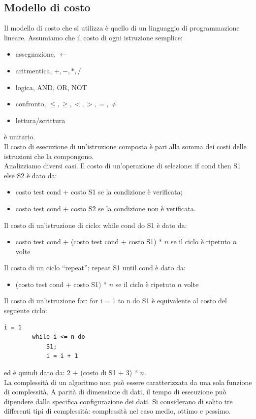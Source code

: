 \documentclass[12pt]{report}
\begin{document}
   	\subsection{Modello di costo}
   	Il modello di costo che si utilizza è quello di un linguaggio di programmazione lineare. Assumiamo che il costo di ogni istruzione semplice:
   	\begin{itemize}
   		\item assegnazione, $\leftarrow $
   		\item aritmentica, $+, -, *, /$
   		\item logica, AND, OR, NOT
   		\item confronto, $\leq, \geq, <, >, =, \neq$
   		\item lettura/scrittura
   	\end{itemize}
   	è unitario. \\
   	Il costo di esecuzione di un'istruzione composta è pari alla somma dei costi delle istruzioni che la compongono. \\
   	Analizziamo diversi casi. Il costo di un'operazione di selezione: if cond then S1 else S2 è dato da:
   	\begin{itemize}
   		\item costo test cond + costo S1 se la condizione è verificata;
   		\item costo test cond + costo S2 se la condizione non è verificata.
   	\end{itemize}
   	Il costo di un'istruzione di ciclo: while cond do S1 è dato da:
   	\begin{itemize}
   		\item costo test cond + (costo test cond + costo S1) * $n$ se il ciclo è ripetuto $n$ volte
   	\end{itemize}
   	Il costo di un ciclo ``repeat'': repeat S1 until cond è dato da:
   	\begin{itemize}
   		\item (costo test cond + costo S1) * $n$ se il ciclo è ripetuto $n$ volte
   	\end{itemize}
   	Il costo di un'istruzione for: for i = 1 to n do S1 è equivalente al costo del seguente ciclo:
   	\begin{lstlisting}[style=pascalstyle]
   		i = 1
   		while i <= n do
   			S1;
   			i = i + 1
   	\end{lstlisting}
   	ed è quindi dato da: 2 + (costo di S1 + 3) * $n$. \\
   	La complessità di un algoritmo non può essere caratterizzata da una sola funzione di complessità. A parità di dimensione di dati, il tempo di esecuzione può dipendere dalla specifica configurazione dei dati. Si considerano di solito tre differenti tipi di complessità: complessità nel caso medio, ottimo e pessimo.
\end{document}

